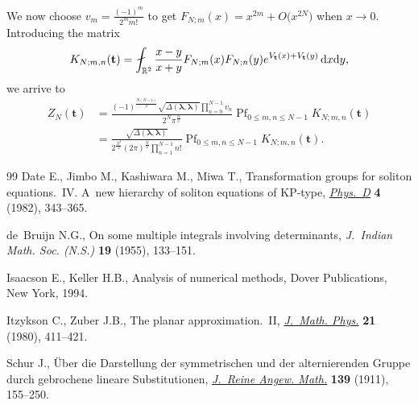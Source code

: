 \documentclass[11pt]{article}
\numberwithin{equation}{section}
\numberwithin{equation}{section}
\newcommand{\dd}{\mathrm{d}}
\begin{document}
We now choose $v_m = \frac{(-1)^m}{2^m m!}$ to get $F_{N;m}(x) = x^{2m} + O\bigl(x^{2N}\bigr)$ when $x \rightarrow 0$. Introducing the matrix
\[
K_{N;m,n}(\mathbf{t}) = \fint_{\mathbb{R}^2} \frac{x - y}{x + y}F_{N;m}(x)F_{N;n}(y) {\rm e}^{V_{\mathbf{t}}(x) + V_{\mathbf{t}}(y)}\, \dd x \dd y,
\]
we arrive to
\begin{equation*}
\begin{split}
Z_N(\mathbf{t}) & = \frac{(-1)^{\frac{N(N - 1)}{2}} \sqrt{\Delta(\boldsymbol{\lambda},\boldsymbol{\lambda})} \prod_{n = 0}^{N - 1} v_n}{2^N \pi^{\frac{N}{2}}}   \operatorname{Pf}_{0 \leq m,n \leq N - 1} K_{N;m,n}(\mathbf{t}) \\
& = \frac{\sqrt{\Delta(\boldsymbol{\lambda},\boldsymbol{\lambda})}}{2^{\frac{N^2}{2}} (2\pi)^{\frac{N}{2}} \prod_{n = 1}^{N - 1} n!}  \operatorname{Pf}_{0 \leq m,n \leq N - 1} K_{N;m,n}(\mathbf{t}).
\end{split}
\end{equation*}


\begin{thebibliography}{99}
Date E., Jimbo M., Kashiwara M., Miwa T., Transformation groups for soliton
 equations.~{IV}. {A}~new hierarchy of soliton equations of {KP}-type,
 \href{https://doi.org/10.1016/0167-2789(82)90041-0}{\textit{Phys.~D}} \textbf{4} (1982), 343--365.

de~Bruijn N.G., On some multiple integrals involving determinants,
 \textit{J.~Indian Math. Soc. (N.S.)} \textbf{19} (1955), 133--151.

Isaacson E., Keller H.B., Analysis of numerical methods, Dover Publications,
 New York, 1994.

Itzykson C., Zuber J.B., The planar approximation.~{II}, \href{https://doi.org/10.1063/1.524438}{\textit{J.~Math.
 Phys.}} \textbf{21} (1980), 411--421.

Schur J., \"Uber die {D}arstellung der symmetrischen und der alternierenden
 {G}ruppe durch gebrochene lineare {S}ubstitutionen, \href{https://doi.org/10.1515/crll.1911.139.155}{\textit{J.~Reine Angew.
 Math.}} \textbf{139} (1911), 155--250.

\end{thebibliography}
\end{document}
